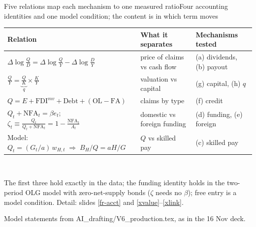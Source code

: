 \documentclass[aspectratio=169,10pt,t]{beamer}
\newcommand{\src}[1]{\vfill{\tiny\textcolor{muted}{#1}\par}\vspace{0.04cm}}
\begin{document}
\begin{frame}[label=fr-framework]{Five relations map each mechanism to one measured ratio}{Four accounting identities and one model condition; the content is in which term moves}
\vspace{0.05cm}
{\small\setlength{\tabcolsep}{4pt}\renewcommand{\arraystretch}{1.0}
\begin{tabular}{@{}>{\raggedright}p{6.75cm}>{\raggedright}p{3.85cm}>{\raggedright\arraybackslash}p{2.7cm}@{}}\toprule
Relation & What it separates & Mechanisms tested\\\midrule
$\displaystyle\Delta\log\frac{Q}{D}=\Delta\log\frac{Q}{Y}-\Delta\log\frac{D}{Y}$ & price of claims vs cash flow & (a) dividends, (b) payout\\\addlinespace[6pt]
$\displaystyle\frac{Q}{Y}=\underbrace{\frac{Q}{K}}_{q}\times\frac{K}{Y}$ & valuation vs capital & (g) capital, (h) $q$\\\addlinespace[6pt]
$Q=E+\mathrm{FDI}^{mv}+\mathrm{Debt}+(\mathrm{OL}-\mathrm{FA})$ & claims by type & (f) credit\\\addlinespace[6pt]
$Q_t+\mathrm{NFA}_t=\beta e_t$;\; $\zeta_t\equiv\frac{Q_t}{Q_t+\mathrm{NFA}_t}=1-\frac{\mathrm{NFA}_t}{A_t}$ & domestic vs foreign funding & (d) funding, (e) foreign\\\addlinespace[6pt]
Model: $Q_t=(G_t/a)\,w_{H,t}\;\Rightarrow\;B_H/Q=aH/G$ & $Q$ vs skilled pay & (c) skilled pay\\\bottomrule
\end{tabular}}\\[0.08cm]
{\footnotesize The first three hold exactly in the data; the funding identity holds in the two-period OLG model with zero-net-supply bonds ($\zeta$ needs no $\beta$); free entry is a model condition. Detail: slides \ref{fr-acct} and \ref{xvalue}--\ref{xlink}.\par}
\src{Model statements from AI\_drafting/V6\_production.tex, as in the 16 Nov deck.}
\end{frame}
\end{document}
